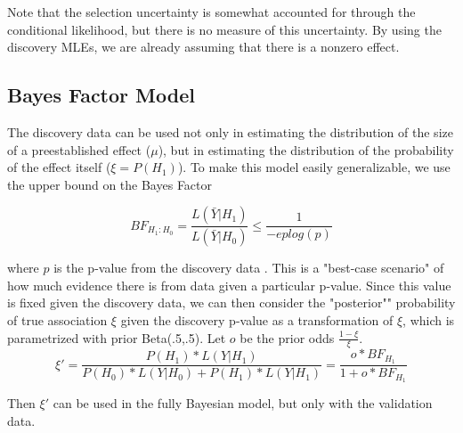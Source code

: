 \documentclass[AMA,STIX1COL]{WileyNJD-v2}\usepackage[]{graphicx}\usepackage[]{color}
\begin{document}
Note that the selection uncertainty is somewhat accounted for through the conditional likelihood, but there is no measure of this uncertainty. By using the discovery MLEs, we are already assuming that there is a nonzero effect.


\subsection{Bayes Factor Model}

The discovery data can be used not only in estimating the distribution of the size of a preestablished effect ($\mu$), but in estimating the distribution of the probability of the effect itself ($\xi = P(H_1)$). To make this model easily generalizable, we use the upper bound on the Bayes Factor

\begin{equation}\label{eq7}
BF_{H_1:H_0} = \frac{L(\bar Y | H_1)}{L(\bar Y | H_0)} \leq \frac{1}{-e p log(p)}
\end{equation}

where $p$ is the p-value from the discovery data \cite{sellke2001calibration}. This is a "best-case scenario" of how much evidence there is from data given a particular p-value. Since this value is fixed given the discovery data, we can then consider the "posterior"" probability of true association $\xi$ given the discovery p-value as a transformation of $\xi$, which is parametrized with prior Beta(.5,.5). Let $o$ be the prior odds $\frac{1-\xi}{\xi}$.
\begin{equation}\label{eq8}
\xi' = \frac{P(H_1)*L(Y|H_1)}{P(H_0)*L(Y|H_0)+P(H_1)*L(Y|H_1)} = \frac{o*BF_{H_1}}{1+o*BF_{H_1}}
\end{equation}

Then $\xi'$ can be used in the fully Bayesian model, but only with the validation data.
\end{document}
